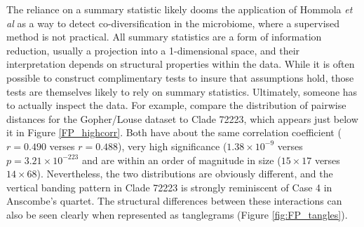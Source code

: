

The reliance on a summary statistic likely dooms the application of Hommola {\em et al} as a way to detect co-diversification in the microbiome, where a supervised method is not practical. All summary statistics are a form of information reduction, usually a projection into a 1-dimensional space, and their interpretation depends on structural properties within the data. While it is often possible to construct complimentary tests to insure that assumptions hold, those tests are themselves likely to rely on summary statistics. Ultimately, someone has to actually inspect the data. \cite{anscombe1973graphs} For example, compare the distribution of pairwise distances for the Gopher/Louse dataset \cite{hafner1994disparate} to Clade 72223, which appears just below it in Figure \ref{FP_highcorr}. Both have about the same correlation coefficient ($r=0.490$ verses $r=0.488$), very high significance ($1.38\times 10^{-9}$ verses $p=3.21\times 10^{-223}$ and are within an order of magnitude in size ($15 \times 17$ verses $14 \times 68$). Nevertheless, the two distributions are obviously different, and the vertical banding pattern in Clade 72223 is strongly reminiscent of Case 4 in Anscombe's quartet. The structural differences between these interactions can also be seen clearly when represented as tanglegrams (Figure \ref{fig:FP_tangles}).



